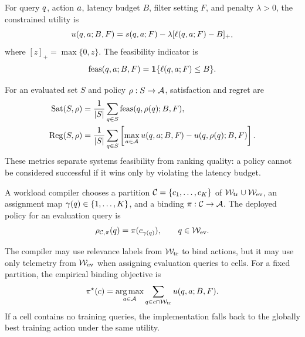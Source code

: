 \begin{definition}
For query $q$, action $a$, latency budget $B$, filter setting $F$, and penalty $\lambda>0$, the constrained utility is
\begin{equation}
  u(q,a;B,F)=
  s(q,a;F)-\lambda[\ell(q,a;F)-B]_+,
\end{equation}
where $[z]_+=\max\{0,z\}$. The feasibility indicator is
\begin{equation}
  \mathrm{feas}(q,a;B,F)=\mathbf{1}\{\ell(q,a;F)\le B\}.
\end{equation}
\end{definition}

For an evaluated set $S$ and policy $\rho:S\rightarrow\mathcal{A}$, satisfaction and regret are
\begin{align}
  \mathrm{Sat}(S,\rho)&=\frac{1}{|S|}\sum_{q\in S}\mathrm{feas}(q,\rho(q);B,F),\\
  \mathrm{Reg}(S,\rho)&=\frac{1}{|S|}\sum_{q\in S}
  \left[\max_{a\in\mathcal{A}}u(q,a;B,F)-u(q,\rho(q);B,F)\right].
\end{align}
These metrics separate systems feasibility from ranking quality: a policy cannot be considered successful if it wins only by violating the latency budget.

\begin{definition}
A workload compiler chooses a partition $\mathcal{C}=\{c_1,\ldots,c_K\}$ of $\mathcal{W}_{\mathrm{tr}}\cup\mathcal{W}_{\mathrm{ev}}$, an assignment map $\gamma(q)\in\{1,\ldots,K\}$, and a binding $\pi:\mathcal{C}\rightarrow\mathcal{A}$. The deployed policy for an evaluation query is
\begin{equation}
  \rho_{\mathcal{C},\pi}(q)=\pi(c_{\gamma(q)}),\qquad q\in\mathcal{W}_{\mathrm{ev}}.
\end{equation}
\end{definition}

The compiler may use relevance labels from $\mathcal{W}_{\mathrm{tr}}$ to bind actions, but it may use only telemetry from $\mathcal{W}_{\mathrm{ev}}$ when assigning evaluation queries to cells. For a fixed partition, the empirical binding objective is
\begin{equation}
\label{eq:cell-binding}
  \pi^\star(c)=
  \operatorname*{arg\,max}_{a\in\mathcal{A}}
  \sum_{q\in c\cap\mathcal{W}_{\mathrm{tr}}}
  u(q,a;B,F).
\end{equation}
If a cell contains no training queries, the implementation falls back to the globally best training action under the same utility.

